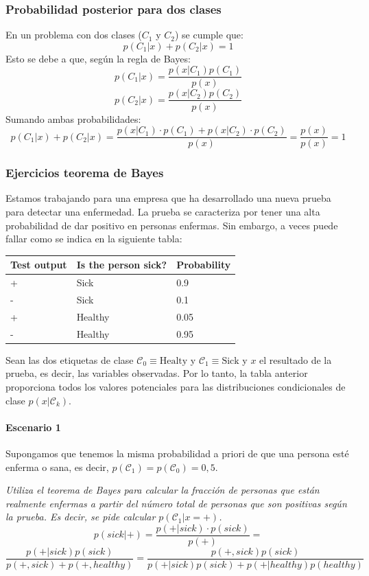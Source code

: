 \subsubsection{Probabilidad posterior para dos clases}
En un problema con dos clases ($C_1$ y $C_2$) se cumple que:
$$p(C_1|x) + p(C_2|x) = 1$$
Esto se debe a que, según la regla de Bayes:
$$p(C_1|x) = \frac{p(x|C_1) p(C_1)}{p(x)}$$
$$p(C_2|x) = \frac{p(x|C_2) p(C_2)}{p(x)}$$
Sumando ambas probabilidades:
$$p(C_1|x) + p(C_2|x) = \frac{p(x|C_1) \cdot p(C_1) + p(x|C_2) \cdot p(C_2)}{p(x)} = \frac{p(x)}{p(x)} = 1$$

\subsubsection{Ejercicios teorema de Bayes}
Estamos trabajando para una empresa que ha desarrollado una nueva prueba para detectar una enfermedad. La prueba se caracteriza por tener una alta probabilidad de dar positivo en personas enfermas. Sin embargo, a veces puede fallar como se indica en la siguiente tabla:

\begin{table}[h]
    \centering
    \begin{tabular}{|l|l|l|}
    \hline
        Test output & Is the person sick? & Probability \\ \hline
        + & Sick & 0.9 \\ \hline
        - & Sick & 0.1 \\ \hline
        + & Healthy & 0.05 \\ \hline
        - & Healthy & 0.95 \\ \hline
    \end{tabular}
\end{table}

Sean las dos etiquetas de clase $\mathcal{C}_0 \equiv \text{Healty}$ y $\mathcal{C}_1 \equiv \text{Sick}$ y $x$ el resultado de la prueba, es decir, las variables observadas. Por lo tanto, la tabla anterior proporciona todos los valores potenciales para las distribuciones condicionales de clase $p(x|\mathcal{C}_k)$.

\paragraph{Escenario 1} 
Supongamos que tenemos la misma probabilidad a priori de que una persona esté enferma o sana, es decir, $p(\mathcal{C}_1)=p(\mathcal{C}_0)=0,5$. 

\textit{Utiliza el teorema de Bayes para calcular la fracción de personas que están realmente enfermas a partir del número total de personas que son positivas según la prueba. Es decir, se pide calcular $p(\mathcal{C}_1|x=+)$.}
$$p(sick|+) = \frac{p(+|sick) \cdot p(sick)}{p(+)} =$$
$$ \frac{p(+|sick) p(sick)}{p(+, sick) + p(+, healthy)} = \frac{p(+, sick) p(sick)}{p(+|sick)p(sick) + p(+|healthy) p(healthy)}$$

